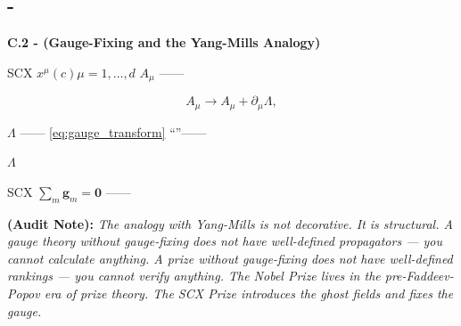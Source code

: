 \documentclass[12pt,a4paper]{article}
\theoremstyle{remark}
\newcommand{\sumgd}{\sum_m \mathbf{g}_m = \mathbf{0}}
\newcommand{\auditnote}[1]{%
    \medskip\noindent
    \textbf{ (Audit Note):} \textit{#1}%
}
\begin{document}
\subsection{-}

\noindent
\textbf{C.2 - (Gauge-Fixing and the Yang-Mills Analogy)}

SCX $x^\mu(c)$$\mu = 1, \dots, d$ $A_\mu$ ——

\begin{equation}
    A_\mu \to A_\mu + \partial_\mu \Lambda,
    \label{eq:gauge_transform}
\end{equation}

 $\Lambda$ —— \eqref{eq:gauge_transform} ``''\textbf{}——

$\Lambda$\textbf{}

SCX $\sumgd$ ——

\auditnote{The analogy with Yang-Mills is not decorative. It is structural. A gauge theory without gauge-fixing does not have well-defined propagators — you cannot calculate anything. A prize without gauge-fixing does not have well-defined rankings — you cannot verify anything. The Nobel Prize lives in the pre-Faddeev-Popov era of prize theory. The SCX Prize introduces the ghost fields and fixes the gauge.}
\end{document}
